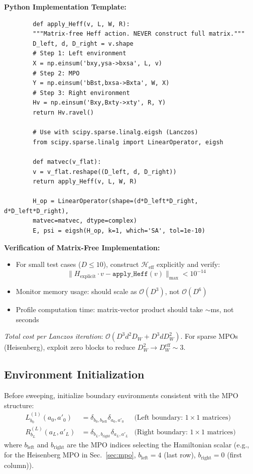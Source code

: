 \documentclass[aps,prb,onecolumn,scriptaddress]{revtex4-2}
\newcommand{\Order}{\mathcal{O}}
\begin{document}
	\textbf{Python Implementation Template:}
	\begin{verbatim}
		def apply_Heff(v, L, W, R):
		"""Matrix-free Heff action. NEVER construct full matrix."""
		D_left, d, D_right = v.shape
		# Step 1: Left environment
		X = np.einsum('bxy,ysa->bxsa', L, v)
		# Step 2: MPO
		Y = np.einsum('bBst,bxsa->Bxta', W, X)
		# Step 3: Right environment
		Hv = np.einsum('Bxy,Bxty->xty', R, Y)
		return Hv.ravel()
		
		# Use with scipy.sparse.linalg.eigsh (Lanczos)
		from scipy.sparse.linalg import LinearOperator, eigsh
		
		def matvec(v_flat):
		v = v_flat.reshape((D_left, d, D_right))
		return apply_Heff(v, L, W, R)
		
		H_op = LinearOperator(shape=(d*D_left*D_right, d*D_left*D_right),
		matvec=matvec, dtype=complex)
		E, psi = eigsh(H_op, k=1, which='SA', tol=1e-10)
		\end{verbatim}
		
		\textbf{Verification of Matrix-Free Implementation:}
		\begin{itemize}
		\item For small test cases ($D \leq 10$), construct $\mathcal{H}_{\text{eff}}$ explicitly and verify:
		\begin{equation}
			\|H_{\text{explicit}} \cdot v - \texttt{apply\_Heff}(v)\|_{\max} < 10^{-14}
		\end{equation}
		\item Monitor memory usage: should scale as $\Order(D^3)$, not $\Order(D^6)$
		\item Profile computation time: matrix-vector product should take $\sim$ms, not seconds
		\end{itemize}
		
		\textit{Total cost per Lanczos iteration}: $\Order(D^3 d^2 D_W + D^3 d D_W^2)$. For sparse MPOs (Heisenberg), exploit zero blocks to reduce $D_W^2 \to D_W^{\text{eff}} \sim 3$.


\subsection{Environment Initialization}
Before sweeping, initialize boundary environments consistent with the MPO structure:
\begin{align}
L^{(1)}_{b_0}(a_0, a'_0) &= \delta_{b_0, b_{\text{left}}} \delta_{a_0, a'_0} & \text{(Left boundary: $1 \times 1$ matrices)} \\
R^{(L)}_{b_L}(a_L, a'_L) &= \delta_{b_L, b_{\text{right}}} \delta_{a_L, a'_L} & \text{(Right boundary: $1 \times 1$ matrices)}
\end{align}
where $b_{\text{left}}$ and $b_{\text{right}}$ are the MPO indices selecting the Hamiltonian scalar (e.g., for the Heisenberg MPO in Sec.~\ref{sec:mpo}, $b_{\text{left}}=4$ (last row), $b_{\text{right}}=0$ (first column)).
\end{document}
